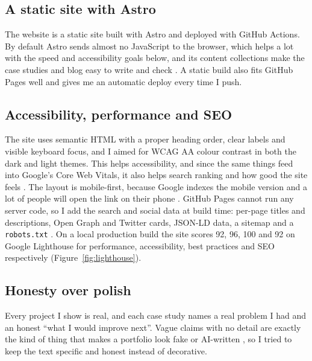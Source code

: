 \documentclass[11pt,a4paper]{article}
\begin{document}
\subsection{A static site with Astro}
The website is a static site built with Astro and deployed with GitHub Actions. By default Astro sends almost no JavaScript to the browser, which helps a lot with the speed and accessibility goals below, and its content collections make the case studies and blog easy to write and check \citep{astroDocs}. A static build also fits GitHub Pages well and gives me an automatic deploy every time I push.

\subsection{Accessibility, performance and SEO}
The site uses semantic HTML with a proper heading order, clear labels and visible keyboard focus, and I aimed for WCAG AA colour contrast in both the dark and light themes. This helps accessibility, and since the same things feed into Google's Core Web Vitals, it also helps search ranking and how good the site feels \citep{siteimproveCWV, owdt}. The layout is mobile-first, because Google indexes the mobile version and a lot of people will open the link on their phone \citep{engagecoders}. GitHub Pages cannot run any server code, so I add the search and social data at build time: per-page titles and descriptions, Open Graph and Twitter cards, JSON-LD data, a sitemap and a \texttt{robots.txt} \citep{jekyllpadSEO}. On a local production build the site scores 92, 96, 100 and 92 on Google Lighthouse for performance, accessibility, best practices and SEO respectively (Figure~\ref{fig:lighthouse}).

\subsection{Honesty over polish}
Every project I show is real, and each case study names a real problem I had and an honest ``what I would improve next''. Vague claims with no detail are exactly the kind of thing that makes a portfolio look fake or AI-written \citep{learnist}, so I tried to keep the text specific and honest instead of decorative.
\end{document}
